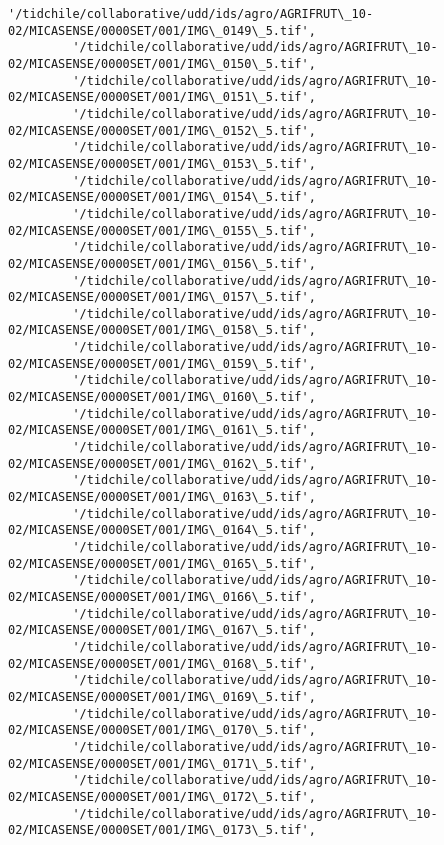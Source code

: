 \documentclass[11pt]{article}
\begin{document}
\begin{Verbatim}[commandchars=\\\{\}]
         '/tidchile/collaborative/udd/ids/agro/AGRIFRUT\_10-02/MICASENSE/0000SET/001/IMG\_0149\_5.tif',
         '/tidchile/collaborative/udd/ids/agro/AGRIFRUT\_10-02/MICASENSE/0000SET/001/IMG\_0150\_5.tif',
         '/tidchile/collaborative/udd/ids/agro/AGRIFRUT\_10-02/MICASENSE/0000SET/001/IMG\_0151\_5.tif',
         '/tidchile/collaborative/udd/ids/agro/AGRIFRUT\_10-02/MICASENSE/0000SET/001/IMG\_0152\_5.tif',
         '/tidchile/collaborative/udd/ids/agro/AGRIFRUT\_10-02/MICASENSE/0000SET/001/IMG\_0153\_5.tif',
         '/tidchile/collaborative/udd/ids/agro/AGRIFRUT\_10-02/MICASENSE/0000SET/001/IMG\_0154\_5.tif',
         '/tidchile/collaborative/udd/ids/agro/AGRIFRUT\_10-02/MICASENSE/0000SET/001/IMG\_0155\_5.tif',
         '/tidchile/collaborative/udd/ids/agro/AGRIFRUT\_10-02/MICASENSE/0000SET/001/IMG\_0156\_5.tif',
         '/tidchile/collaborative/udd/ids/agro/AGRIFRUT\_10-02/MICASENSE/0000SET/001/IMG\_0157\_5.tif',
         '/tidchile/collaborative/udd/ids/agro/AGRIFRUT\_10-02/MICASENSE/0000SET/001/IMG\_0158\_5.tif',
         '/tidchile/collaborative/udd/ids/agro/AGRIFRUT\_10-02/MICASENSE/0000SET/001/IMG\_0159\_5.tif',
         '/tidchile/collaborative/udd/ids/agro/AGRIFRUT\_10-02/MICASENSE/0000SET/001/IMG\_0160\_5.tif',
         '/tidchile/collaborative/udd/ids/agro/AGRIFRUT\_10-02/MICASENSE/0000SET/001/IMG\_0161\_5.tif',
         '/tidchile/collaborative/udd/ids/agro/AGRIFRUT\_10-02/MICASENSE/0000SET/001/IMG\_0162\_5.tif',
         '/tidchile/collaborative/udd/ids/agro/AGRIFRUT\_10-02/MICASENSE/0000SET/001/IMG\_0163\_5.tif',
         '/tidchile/collaborative/udd/ids/agro/AGRIFRUT\_10-02/MICASENSE/0000SET/001/IMG\_0164\_5.tif',
         '/tidchile/collaborative/udd/ids/agro/AGRIFRUT\_10-02/MICASENSE/0000SET/001/IMG\_0165\_5.tif',
         '/tidchile/collaborative/udd/ids/agro/AGRIFRUT\_10-02/MICASENSE/0000SET/001/IMG\_0166\_5.tif',
         '/tidchile/collaborative/udd/ids/agro/AGRIFRUT\_10-02/MICASENSE/0000SET/001/IMG\_0167\_5.tif',
         '/tidchile/collaborative/udd/ids/agro/AGRIFRUT\_10-02/MICASENSE/0000SET/001/IMG\_0168\_5.tif',
         '/tidchile/collaborative/udd/ids/agro/AGRIFRUT\_10-02/MICASENSE/0000SET/001/IMG\_0169\_5.tif',
         '/tidchile/collaborative/udd/ids/agro/AGRIFRUT\_10-02/MICASENSE/0000SET/001/IMG\_0170\_5.tif',
         '/tidchile/collaborative/udd/ids/agro/AGRIFRUT\_10-02/MICASENSE/0000SET/001/IMG\_0171\_5.tif',
         '/tidchile/collaborative/udd/ids/agro/AGRIFRUT\_10-02/MICASENSE/0000SET/001/IMG\_0172\_5.tif',
         '/tidchile/collaborative/udd/ids/agro/AGRIFRUT\_10-02/MICASENSE/0000SET/001/IMG\_0173\_5.tif',

\end{Verbatim}
\end{document}
